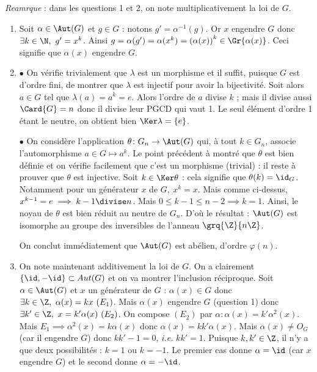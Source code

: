 \textit{Reamrque} : dans les questions 1 et 2, on note multiplicativement la loi de $G$.

\begin{enumerate}
 \item Soit $\alpha \in \Aut(G)$ et $g\in G$ : notons $g'=\alpha^{-1}(g)$. Or $x$ engendre $G$ donc $\exists k\in \N,~ g'= x^k$. Ainsi $g = \alpha(g') = \alpha(x^k) = \left(\alpha(x)\right)^k \in \Gr{\alpha(x)}$. Ceci signifie que $\alpha(x)$ engendre $G$.
 \item $\bullet$ On vérifie trivialement que $\lambda$ est un morphisme et il suffit, puisque $G$ est d'ordre fini, de montrer que $\lambda$ est injectif pour avoir la bijectivité. Soit alors $a\in G$ tel que $\lambda(a) = a^k = e$. Alors l'ordre de $a$ divise $k$ ; mais il divise aussi $\Card{G} = n$ donc il divise leur PGCD qui vaut 1. Le seul élément d'ordre 1 étant le neutre, on obtient bien $\Ker \lambda = \{e\}$.

 $\bullet$ On considère l'application $\theta \colon G_n\to \Aut(G)$ qui, à tout $k\in G_n$, associe l'automorphisme $a\in G\mapsto a^k$. Le point précédent à montré que $\theta$ est bien définie et on vérifie facilement que c'est un morphisme (trivial) : il reste à prouver que $\theta$ est injective. Soit $k\in \Ker \theta$ : cela signifie que $\theta(k)= \id_G$. Notamment pour un générateur $x$ de $G,~ x^k = x$. Mais comme ci-dessus, $x^{k-1} = e\implies k-1  \divise n$. Mais $0\leqslant k-1\leqslant n-2\implies k=1$. Ainsi, le noyau de $\theta$ est bien réduit au neutre de $G_n$. D'où le résultat : $\Aut(G)$ est isomorphe au groupe des inversibles de l'anneau $\grq{\Z}{n\Z}$.

 On conclut immédiatement que $\Aut(G)$ est abélien, d'ordre $\varphi(n)$.

 \item On note maintenant additivement la loi de $G$. On a clairement $\{\id, -\id \}\subset Aut(G)$ et on va montrer l'inclusion réciproque. Soit $\alpha \in \Aut(G)$ et $x$ un générateur de $G$ : $\alpha(x)\in G$ donc $\exists k\in \Z,~ \alpha(x) = kx~ (E_1)$. Mais $\alpha(x)$ engendre $G$ (question 1) donc $\exists k' \in \Z,~ x = k'\alpha(x)~ (E_2)$. On compose $(E_2)$ par $\alpha : \alpha(x) = k' \alpha^2(x)$. Mais $E_1\implies \alpha^2(x) = k\alpha(x)$ donc $\alpha(x) = kk' \alpha(x)$. Mais $\alpha(x)\neq O_G$ (car il engendre $G$) donc $kk' -1 = 0$, \textit{i.e.} $kk' = 1$. Puisque $k,k'\in \Z$, il n'y a que deux possibilités : $k =1$ ou $k=-1$. Le premier cas donne $\alpha = \id$ (car $x$ engendre $G$) et le second donne $\alpha = -\id$.


\end{enumerate}

